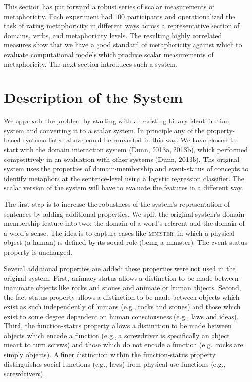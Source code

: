 \documentclass[11pt]{article}
\begin{document}
This section has put forward a robust series of scalar measurements of metaphoricity. Each experiment had 100 participants and operationalized the task of rating metaphoricity in different ways across a representative section of domains, verbs, and metaphoricity levels. The resulting highly correlated measures show that we have a good standard of metaphoricity against which to evaluate computational models which produce scalar measurements of metaphoricity. The next section introduces such a system.

\section{Description of the System}

We approach the problem by starting with an existing binary identification system and converting it to a scalar system. In principle any of the property-based systems listed above could be converted in this way. We have chosen to start with the domain interaction system (Dunn, 2013a, 2013b), which performed competitively in an evaluation with other systems (Dunn, 2013b). The original system uses the properties of domain-membership and event-status of concepts to identify metaphors at the sentence-level using a logistic regression classifier. The scalar version of the system will have to evaluate the features in a different way.

The first step is to increase the robustness of the system's representation of sentences by adding additional properties. We split the original system's domain membership feature into two: the domain of a word's referent and the domain of a word's sense. The idea is to capture cases like \textsc{minister}, in which a physical object (a human) is defined by its social role (being a minister). The event-status property is unchanged.

Several additional properties are added; these properties were not used in the original system. First, animacy-status allows a distinction to be made between inanimate objects like rocks and stones and animate or human objects. Second, the fact-status property allows a distinction to be made between objects which exist as such independently of humans (e.g., rocks and stones) and those which exist to some degree dependent on human consciousness (e.g., laws and ideas). Third, the function-status property allows a distinction to be made between objects which encode a function (e.g., a screwdriver is specifically an object meant to turn screws) and those which do not encode a function (e.g., rocks are simply objects). A finer distinction within the function-status property distinguishes social functions (e.g., laws) from physical-use functions (e.g., screwdrivers).
\end{document}
